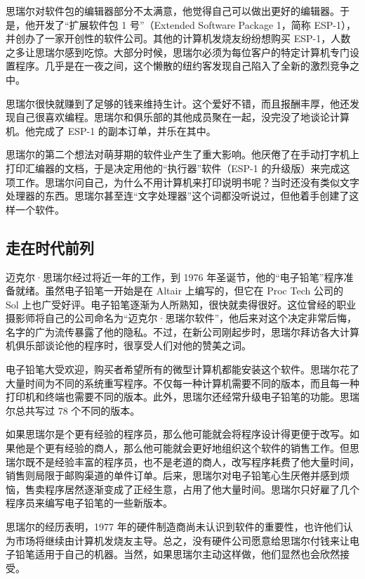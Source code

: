 \documentclass[12pt,UTF8]{ctexbook}
\begin{document}
思瑞尔对软件包的编辑器部分不太满意，他觉得自己可以做出更好的编辑器。于是，他开发了“扩展软件包 1 号”（Extended Software Package 1，简称 ESP-1），并创办了一家开创性的软件公司。其他的计算机发烧友纷纷想购买 ESP-1，人数之多让思瑞尔感到吃惊。大部分时候，思瑞尔必须为每位客户的特定计算机专门设置程序。几乎是在一夜之间，这个懒散的纽约客发现自己陷入了全新的激烈竞争之中。

思瑞尔很快就赚到了足够的钱来维持生计。这个爱好不错，而且报酬丰厚，他还发现自己很喜欢编程。思瑞尔和俱乐部的其他成员聚在一起，没完没了地谈论计算机。他完成了 ESP-1 的副本订单，并乐在其中。

思瑞尔的第二个想法对萌芽期的软件业产生了重大影响。他厌倦了在手动打字机上打印汇编器的文档，于是决定用他的“执行器”软件（ESP-1 的升级版）来完成这项工作。思瑞尔问自己，为什么不用计算机来打印说明书呢？当时还没有类似文字处理器的东西。思瑞尔甚至连“文字处理器”这个词都没听说过，但他着手创建了这样一个软件。





\subsection{走在时代前列}


迈克尔·思瑞尔经过将近一年的工作，到 1976 年圣诞节，他的“电子铅笔”程序准备就绪。虽然电子铅笔一开始是在 Altair 上编写的，但它在 Proc Tech 公司的 Sol 上也广受好评。电子铅笔逐渐为人所熟知，很快就卖得很好。这位曾经的职业摄影师将自己的公司命名为“迈克尔·思瑞尔软件”，他后来对这个决定非常后悔，名字的广为流传暴露了他的隐私。不过，在新公司刚起步时，思瑞尔拜访各大计算机俱乐部谈论他的程序时，很享受人们对他的赞美之词。

电子铅笔大受欢迎，购买者希望所有的微型计算机都能安装这个软件。思瑞尔花了大量时间为不同的系统重写程序。不仅每一种计算机需要不同的版本，而且每一种打印机和终端也需要不同的版本。此外，思瑞尔还经常升级电子铅笔的功能。思瑞尔总共写过 78 个不同的版本。

如果思瑞尔是个更有经验的程序员，那么他可能就会将程序设计得更便于改写。如果他是个更有经验的商人，那么他可能就会更好地组织这个软件的销售工作。但思瑞尔既不是经验丰富的程序员，也不是老道的商人，改写程序耗费了他大量时间，销售则局限于邮购渠道的单件订单。后来，思瑞尔对电子铅笔心生厌倦并感到烦恼，售卖程序居然逐渐变成了正经生意，占用了他大量时间。思瑞尔只好雇了几个程序员来编写电子铅笔的一些新版本。

思瑞尔的经历表明，1977 年的硬件制造商尚未认识到软件的重要性，也许他们认为市场将继续由计算机发烧友主导。总之，没有硬件公司愿意给思瑞尔付钱来让电子铅笔适用于自己的机器。当然，如果思瑞尔主动这样做，他们显然也会欣然接受。
\end{document}
